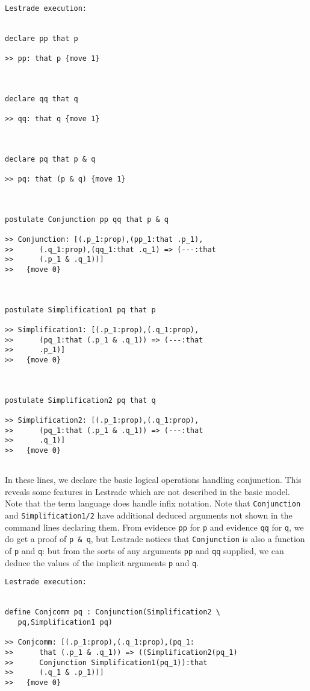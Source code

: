 \documentclass{article}
\begin{document}
\begin{verbatim}Lestrade execution:


declare pp that p

>> pp: that p {move 1}



declare qq that q

>> qq: that q {move 1}



declare pq that p & q

>> pq: that (p & q) {move 1}



postulate Conjunction pp qq that p & q

>> Conjunction: [(.p_1:prop),(pp_1:that .p_1),
>>      (.q_1:prop),(qq_1:that .q_1) => (---:that
>>      (.p_1 & .q_1))]
>>   {move 0}



postulate Simplification1 pq that p

>> Simplification1: [(.p_1:prop),(.q_1:prop),
>>      (pq_1:that (.p_1 & .q_1)) => (---:that
>>      .p_1)]
>>   {move 0}



postulate Simplification2 pq that q

>> Simplification2: [(.p_1:prop),(.q_1:prop),
>>      (pq_1:that (.p_1 & .q_1)) => (---:that
>>      .q_1)]
>>   {move 0}


\end{verbatim}

In these lines, we declare the basic logical operations handling conjunction.  This reveals some features in Lestrade which are not described in the basic model.  Note that the term language does handle infix notation.  Note that {\tt Conjunction} and {\tt Simplification1/2} have additional deduced arguments not shown in the command lines declaring them.  From evidence {\tt pp} for {\tt p} and evidence {\tt qq} for {\tt q}, we do get a proof of {\tt p \& q}, but Lestrade notices that {\tt Conjunction} is also a function of {\tt p} and {\tt q}:  but from the sorts of any arguments {\tt pp} and {\tt qq} supplied, we can deduce the values of the implicit arguments {\tt p} and {\tt q}.

\newpage

\begin{verbatim}Lestrade execution:


define Conjcomm pq : Conjunction(Simplification2 \
   pq,Simplification1 pq)

>> Conjcomm: [(.p_1:prop),(.q_1:prop),(pq_1:
>>      that (.p_1 & .q_1)) => ((Simplification2(pq_1)
>>      Conjunction Simplification1(pq_1)):that
>>      (.q_1 & .p_1))]
>>   {move 0}


\end{verbatim}
\end{document}

